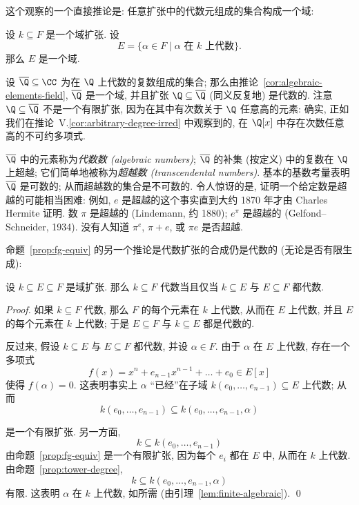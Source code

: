 这个观察的一个直接推论是: 任意扩张中的代数元组成的集合构成一个域:

\begin{corollary}\label{cor:algebraic-elements-field}
设 $k\subseteq F$ 是一个域扩张. 设
\[
E=\{\alpha\in F\mid \alpha\text{ 在 }k\text{ 上代数}\}.
\]
那么 $E$ 是一个域.
\end{corollary}

\begin{example}\label{ex:algebraic-numbers}
设 $\overline{\Q}\subseteq\CC$ 为在 $\Q$ 上代数的复数组成的集合; 那么由推论~\ref{cor:algebraic-elements-field}, $\overline{\Q}$ 是一个域, 并且扩张 $\Q\subseteq\overline{\Q}$ (同义反复地) 是代数的. 注意 $\Q\subseteq\overline{\Q}$ 不是一个有限扩张, 因为在其中有次数关于 $\Q$ 任意高的元素: 确实, 正如我们在推论~V.\ref{cor:arbitrary-degree-irred} 中观察到的, 在 $\Q[x]$ 中存在次数任意高的不可约多项式.

$\overline{\Q}$ 中的元素称为\emph{代数数 (algebraic numbers)}; $\overline{\Q}$ 的补集 (按定义) 中的复数在 $\Q$ 上超越; 它们简单地被称为\emph{超越数 (transcendental numbers)}. 基本的基数考量表明 $\overline{\Q}$ 是可数的; 从而超越数的集合是不可数的. 令人惊讶的是, 证明一个给定数是超越的可能相当困难: 例如, $e$ 是超越的这个事实直到大约 1870 年才由 Charles Hermite 证明. 数 $\pi$ 是超越的 (Lindemann, 约 1880); $e^\pi$ 是超越的 (Gelfond--Schneider, 1934). 没有人知道 $\pi^e$, $\pi+e$, 或 $\pi e$ 是否超越.
\end{example}

命题~\ref{prop:fg-equiv} 的另一个推论是代数扩张的合成仍是代数的 (无论是否有限生成):

\begin{corollary}\label{cor:algebraic-composition}
设 $k\subseteq E\subseteq F$ 是域扩张. 那么 $k\subseteq F$ 代数当且仅当 $k\subseteq E$ 与 $E\subseteq F$ 都代数.
\end{corollary}

\begin{proof}
如果 $k\subseteq F$ 代数, 那么 $F$ 的每个元素在 $k$ 上代数, 从而在 $E$ 上代数, 并且 $E$ 的每个元素在 $k$ 上代数; 于是 $E\subseteq F$ 与 $k\subseteq E$ 都是代数的.

反过来, 假设 $k\subseteq E$ 与 $E\subseteq F$ 都代数, 并设 $\alpha\in F$. 由于 $\alpha$ 在 $E$ 上代数, 存在一个多项式
\[
f(x)=x^n+e_{n-1}x^{n-1}+\dots+e_0\in E[x]
\]
使得 $f(\alpha)=0$. 这表明事实上 $\alpha$ ``已经''在子域 $k(e_0,\ldots,e_{n-1})\subseteq E$ 上代数; 从而
\[
k(e_0,\dots,e_{n-1})\subseteq k(e_0,\dots,e_{n-1},\alpha)
\]

是一个有限扩张. 另一方面,
\[
k\subseteq k(e_0,\dots,e_{n-1})
\]
由命题~\ref{prop:fg-equiv} 是一个有限扩张, 因为每个 $e_i$ 都在 $E$ 中, 从而在 $k$ 上代数. 由命题~\ref{prop:tower-degree},
\[
k\subseteq k(e_0,\ldots,e_{n-1},\alpha)
\]
有限. 这表明 $\alpha$ 在 $k$ 上代数, 如所需 (由引理~\ref{lem:finite-algebraic}). \qed
\end{proof}

